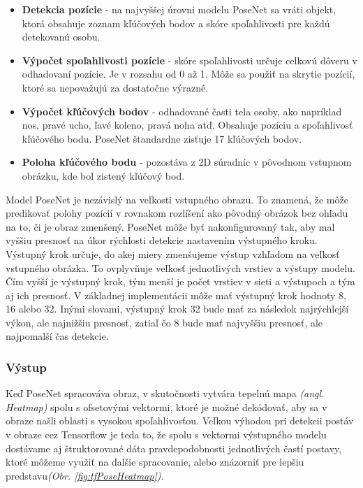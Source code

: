 \documentclass[slovak,master,dept460,male,cpp,cpdeclaration]{diploma}
\begin{document}
\begin{itemize}
\item \textbf{Detekcia pozície} - na najvyššej úrovni modelu PoseNet sa vráti objekt, ktorá obsahuje zoznam kľúčových bodov a skóre spoľahlivosti pre každú detekovanú osobu.
\item \textbf{Výpočet spoľahlivosti pozície} - skóre spoľahlivosti určuje celkovú dôveru v odhadovaní pozície. Je v rozsahu od 0 až 1. Môže sa použiť na skrytie pozícií, ktoré sa nepovažujú za dostatočne výrazné.
\item \textbf{Výpočet kľúčových bodov} - odhadované časti tela osoby, ako napríklad nos, pravé ucho, ľavé koleno, pravá noha atď. Obsahuje pozíciu a spoľahlivosť kľúčového bodu. PoseNet štandardne zisťuje 17 kľúčových bodov.
\item \textbf{Poloha kľúčového bodu} - pozostáva z 2D súradníc v pôvodnom vstupnom obrázku, kde bol zistený kľúčový bod.
\end{itemize}


Model PoseNet je nezávislý na veľkosti vstupného obrazu. To znamená, že môže predikovať polohy pozícií v rovnakom rozlíšení ako pôvodný obrázok bez ohľadu na to, či je obraz zmenšený. PoseNet môže byť nakonfigurovaný tak, aby mal vyššiu presnosť na úkor rýchlosti detekcie nastavením výstupného kroku. Výstupný krok určuje, do akej miery zmenšujeme výstup vzhľadom na veľkosť vstupného obrázka. To ovplyvňuje veľkosť jednotlivých vrstiev a výstupy modelu. Čím vyšší je výstupný krok, tým menší je počet vrstiev v sieti a výstupoch a tým aj ich presnosť. V základnej implementácii môže mať výstupný krok hodnoty 8, 16 alebo 32. Inými slovami, výstupný krok 32 bude mať za následok najrýchlejší výkon, ale najnižšiu presnosť, zatiaľ čo 8 bude mať najvyššiu presnosť, ale najpomalší čas detekcie.


\subsubsection{Výstup}
Keď PoseNet spracováva obraz, v skutočnosti vytvára tepelnú mapa \textit{(angl. Heatmap)} spolu s ofsetovými vektormi, ktoré je možné dekódovať, aby sa v obraze našli oblasti s vysokou spoľahlivosťou. Veľkou výhodou pri detekcii postáv v obraze cez Tensorflow je teda to, že spolu s vektormi výstupného modelu dostávame aj štruktorované dáta pravdepodobnosti jednotlivých častí postavy, ktoré môžeme využiť na ďalšie spracovanie, alebo znázorniť pre lepšiu predstavu\textit{(Obr. \ref{fig:tfPoseHeatmap})}.
\end{document}
